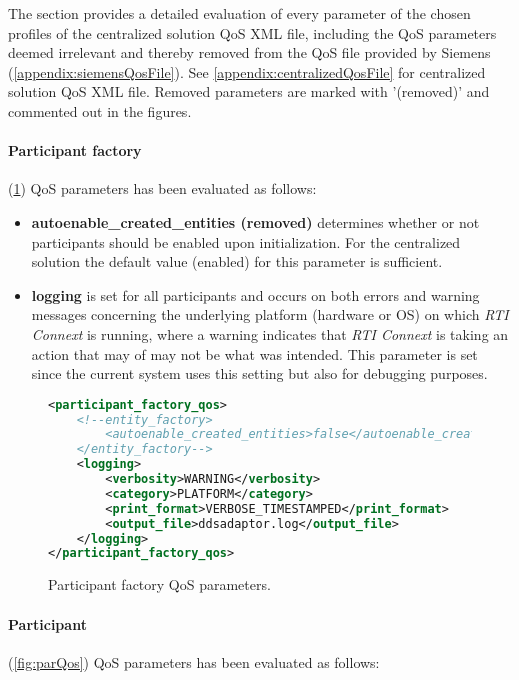 The section provides a detailed evaluation of every parameter of the chosen profiles of the centralized solution QoS XML file, including the QoS parameters deemed irrelevant and thereby removed from the QoS file provided by Siemens (\cref{appendix:siemensQosFile}). See \cref{appendix:centralizedQosFile} for centralized solution QoS XML file. Removed parameters are marked with '(removed)' and commented out in the figures.

\paragraph{Participant factory} (\cref{fig:parFacQos}) QoS parameters has been evaluated as follows:

\begin{itemize}
	\item \textbf{autoenable\_created\_entities (removed)} determines whether or not participants should be enabled upon initialization. For the centralized solution the default value (enabled) for this parameter is sufficient.
	\item \textbf{logging} is set for all participants and occurs on both errors and warning messages concerning the underlying platform (hardware or OS) on which \textit{RTI Connext} is running, where a warning indicates that \textit{RTI Connext} is taking an action that may of may not be what was intended. This parameter is set since the current system uses this setting but also for debugging purposes.
\end{itemize}

\begin{figure}
\begin{lstlisting}[language=XML]
<participant_factory_qos>
	<!--entity_factory>
		<autoenable_created_entities>false</autoenable_created_entities>
	</entity_factory-->
	<logging>
		<verbosity>WARNING</verbosity>
		<category>PLATFORM</category>
		<print_format>VERBOSE_TIMESTAMPED</print_format>
		<output_file>ddsadaptor.log</output_file>
	</logging>
</participant_factory_qos>
\end{lstlisting}
\caption[Participant factory QoS parameters]{
		\label{fig:parFacQos} 
		\footnotesize{Participant factory QoS parameters.}
	}
\end{figure}

\paragraph{Participant} (\cref{fig:parQos}) QoS parameters has been evaluated as follows:
 

